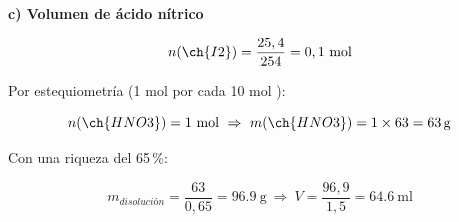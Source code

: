 \begin{exerciseEVAU}
\begin{solu}
        \textbf{c) Volumen de ácido nítrico}

        \begin{equation*}
            n(\ch{I2}) = \dfrac{25,4}{254} = 0,1 \ \text{mol}
        \end{equation*}

        Por estequiometría (1 mol  por cada 10 mol ):

        \begin{equation*}
            n(\ch{HNO3}) = 1 \ \text{mol} \ \Rightarrow \ m(\ch{HNO3}) = 1\times63 = \SI{63}{\gram}
        \end{equation*}

        Con una riqueza del 65\,\%:

        \begin{equation*}
            m_{disolución} = \dfrac{63}{0,65} = \SI{96.9}{\gram} \ \Rightarrow \ V = \dfrac{96,9}{1,5} = \SI{64.6}{\milli\litre}
        \end{equation*}

    \end{solu}
\end{exerciseEVAU}


